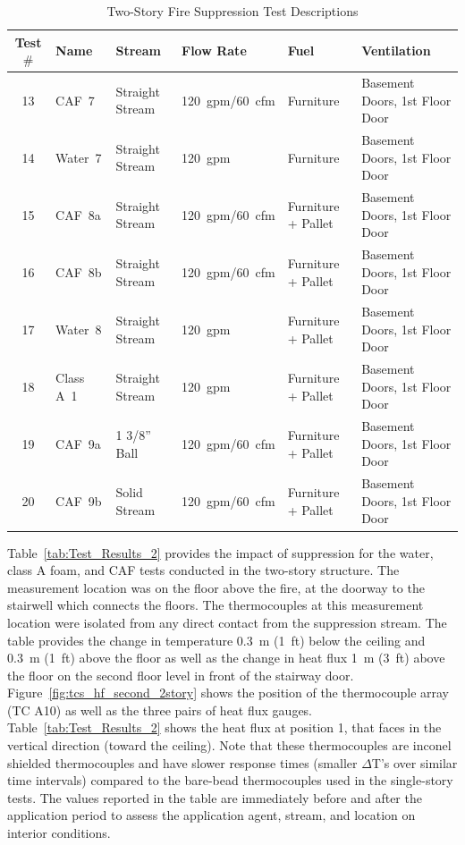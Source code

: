 \documentclass[12pt,oneside]{book}
\begin{document}
\begin{table}[!ht]
\centering
\footnotesize
\caption{Two-Story Fire Suppression Test Descriptions}\label{tab:Test_Descriptions_2}
\begin{tabular}{clllll}
\toprule[1.5pt]
Test $\#$  & Name	& Stream			& Flow Rate		& Fuel                    & Ventilation  \\
\midrule
 13  & CAF~7     &  Straight Stream  	&  120~gpm/60~cfm   & Furniture           & Basement Doors, 1st Floor Door \\
 14  & Water~7   &  Straight Stream  	&  120~gpm    		& Furniture           & Basement Doors, 1st Floor Door \\
 15  & CAF~8a    &  Straight Stream  	&  120~gpm/60~cfm   & Furniture + Pallet  & Basement Doors, 1st Floor Door \\
 16  & CAF~8b    &  Straight Stream  	&  120~gpm/60~cfm   & Furniture + Pallet  & Basement Doors, 1st Floor Door \\
 17  & Water~8   &  Straight Stream     &  120~gpm          & Furniture + Pallet  & Basement Doors, 1st Floor Door \\
 18  & Class A~1 &  Straight Stream  	&  120~gpm		    & Furniture + Pallet  & Basement Doors, 1st Floor Door \\
 19  & CAF~9a    &  1 3/8'' Ball    	&  120~gpm/60~cfm   & Furniture + Pallet  & Basement Doors, 1st Floor Door \\
 20  & CAF~9b    &  Solid Stream        &  120~gpm/60~cfm   & Furniture + Pallet  & Basement Doors, 1st Floor Door \\
\bottomrule[1.25pt]
\end{tabular}\par
\end{table}
  
Table~\ref{tab:Test_Results_2} provides the impact of suppression for the water, class A foam, and CAF tests conducted in the two-story structure. The measurement location was on the floor above the fire, at the doorway to the stairwell which connects the floors. The thermocouples at this measurement location were isolated from any direct contact from the suppression stream. The table provides the change in temperature 0.3~m (1~ft) below the ceiling and 0.3~m (1~ft) above the floor as well as the change in heat flux 1~m (3~ft) above the floor on the second floor level in front of the stairway door. Figure~\ref{fig:tcs_hf_second_2story} shows the position of the thermocouple array (TC A10) as well as the three pairs of heat flux gauges. Table~\ref{tab:Test_Results_2} shows the heat flux at position 1, that faces in the vertical direction (toward the ceiling). Note that these thermocouples are inconel shielded thermocouples and have slower response times (smaller $\Delta$T's over similar time intervals) compared to the bare-bead thermocouples used in the single-story tests. The values reported in the table are immediately before and after the application period to assess the application agent, stream, and location on interior conditions.
\end{document}
